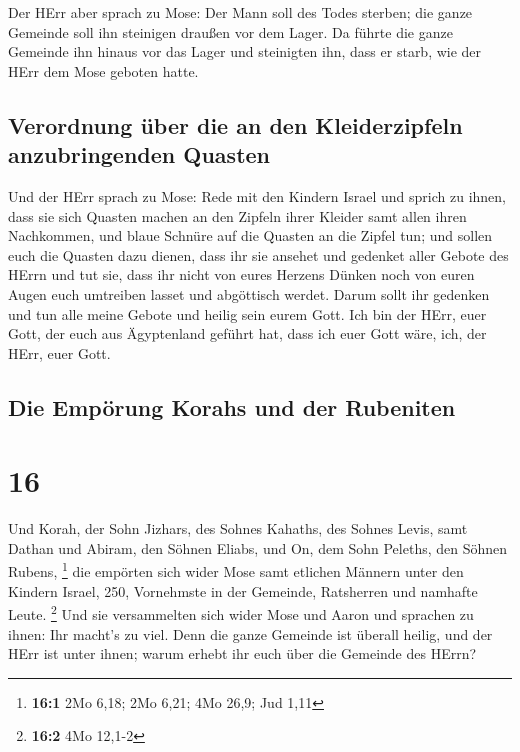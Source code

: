  Der HErr aber sprach zu Mose: Der Mann soll des Todes
sterben; die ganze Gemeinde soll ihn steinigen draußen vor dem Lager.
 Da führte die ganze Gemeinde ihn hinaus vor das Lager
und steinigten ihn, dass er starb, wie der HErr dem Mose geboten hatte.

\hypertarget{verordnung-uxfcber-die-an-den-kleiderzipfeln-anzubringenden-quasten}{%
\subsection{Verordnung über die an den Kleiderzipfeln anzubringenden
Quasten}\label{verordnung-uxfcber-die-an-den-kleiderzipfeln-anzubringenden-quasten}}

 Und der HErr sprach zu Mose:  Rede mit
den Kindern Israel und sprich zu ihnen, dass sie sich Quasten machen an
den Zipfeln ihrer Kleider samt allen ihren Nachkommen, und blaue Schnüre
auf die Quasten an die Zipfel tun;  und sollen euch die
Quasten dazu dienen, dass ihr sie ansehet und gedenket aller Gebote des
HErrn und tut sie, dass ihr nicht von eures Herzens Dünken noch von
euren Augen euch umtreiben lasset und abgöttisch werdet. 
Darum sollt ihr gedenken und tun alle meine Gebote und heilig sein eurem
Gott.  Ich bin der HErr, euer Gott, der euch aus
Ägyptenland geführt hat, dass ich euer Gott wäre, ich, der HErr, euer
Gott.

\hypertarget{die-empuxf6rung-korahs-und-der-rubeniten}{%
\subsection{Die Empörung Korahs und der
Rubeniten}\label{die-empuxf6rung-korahs-und-der-rubeniten}}

\hypertarget{section-15}{%
\section{16}\label{section-15}}

 Und Korah, der Sohn Jizhars, des Sohnes Kahaths, des
Sohnes Levis, samt Dathan und Abiram, den Söhnen Eliabs, und On, dem
Sohn Peleths, den Söhnen Rubens, \footnote{\textbf{16:1} 2Mo 6,18; 2Mo
  6,21; 4Mo 26,9; Jud 1,11}  die empörten sich wider Mose
samt etlichen Männern unter den Kindern Israel, 250, Vornehmste in der
Gemeinde, Ratsherren und namhafte Leute. \footnote{\textbf{16:2} 4Mo
  12,1-2}  Und sie versammelten sich wider Mose und Aaron
und sprachen zu ihnen: Ihr macht's zu viel. Denn die ganze Gemeinde ist
überall heilig, und der HErr ist unter ihnen; warum erhebt ihr euch über
die Gemeinde des HErrn?


